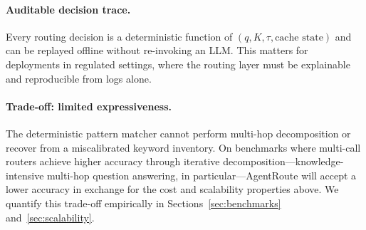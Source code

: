 \documentclass[11pt]{article}
\begin{document}
\paragraph{Auditable decision trace.}
Every routing decision is a deterministic function of $(q, K, \tau, \text{cache state})$
and can be replayed offline without re-invoking an LLM. This matters for
deployments in regulated settings, where the routing layer must be
explainable and reproducible from logs alone.

\paragraph{Trade-off: limited expressiveness.}
The deterministic pattern matcher cannot perform multi-hop decomposition
or recover from a miscalibrated keyword inventory. On benchmarks where
multi-call routers achieve higher accuracy through iterative
decomposition---knowledge-intensive multi-hop question answering, in
particular---AgentRoute will accept a lower accuracy in exchange for the
cost and scalability properties above. We quantify this trade-off
empirically in Sections~\ref{sec:benchmarks} and~\ref{sec:scalability}.


\end{document}

